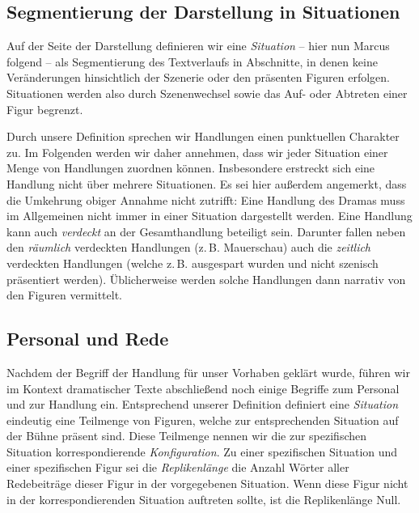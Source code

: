 \documentclass[a4paper,10pt,abstract=true,headings=small]{scrartcl}
\begin{document}
\subsection{Segmentierung der Darstellung in Situationen}\label{sec:situationen}

Auf der Seite der Darstellung definieren wir eine \emph{Situation} – hier nun Marcus folgend – als Segmentierung des Textverlaufs in Abschnitte, in denen keine Veränderungen hinsichtlich der Szenerie oder den präsenten Figuren erfolgen.
Situationen werden also durch Szenenwechsel sowie das Auf- oder Abtreten einer Figur begrenzt.\autocite[Vgl.][140]{marcus_mathematisch-linguistisches_1971} %

Durch unsere Definition sprechen wir Handlungen einen punktuellen Charakter zu.
Im Folgenden werden wir daher annehmen, dass wir jeder Situation einer Menge von Handlungen zuordnen können.
Insbesondere erstreckt sich eine Handlung nicht über mehrere Situationen. 
Es sei hier außerdem angemerkt, dass die Umkehrung obiger Annahme nicht zutrifft: Eine Handlung des Dramas muss im Allgemeinen nicht immer in einer Situation dargestellt werden.
Eine Handlung kann auch \emph{verdeckt} an der Gesamthandlung beteiligt sein.
Darunter fallen neben den \emph{räumlich} verdeckten Handlungen (z.\,B. Mauerschau) auch die \emph{zeitlich} verdeckten Handlungen (welche z.\,B. ausgespart wurden und nicht szenisch präsentiert werden).
Üblicherweise werden solche Handlungen dann narrativ von den Figuren vermittelt.\autocite[Vgl.][276]{pfister_drama:_2001}

\subsection{Personal und Rede}\label{sec:personal}

Nachdem der Begriff der Handlung für unser Vorhaben geklärt wurde, führen wir im Kontext dramatischer Texte abschließend noch einige Begriffe zum Personal und zur Handlung ein.
Entsprechend unserer Definition definiert eine \emph{Situation} eindeutig eine Teilmenge von Figuren, welche zur entsprechenden Situation auf der Bühne präsent sind.
Diese Teilmenge nennen wir die zur spezifischen Situation korrespondierende \emph{Konfiguration}.\autocite[Vgl.][235]{pfister_drama:_2001}
Zu einer spezifischen Situation und einer spezifischen Figur sei die \emph{Replikenlänge} die Anzahl Wörter aller Redebeiträge dieser Figur in der vorgegebenen Situation.
Wenn diese Figur nicht in der korrespondierenden Situation auftreten sollte, ist die Replikenlänge Null.
\end{document}
